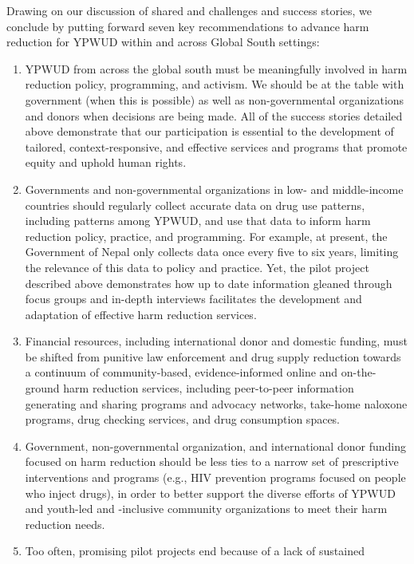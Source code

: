 \documentclass[
  letterpaper,
  DIV=11,
  numbers=noendperiod]{scrartcl}
\providecommand{\tightlist}{%
  \setlength{\itemsep}{0pt}\setlength{\parskip}{0pt}}\usepackage{longtable,booktabs,array}
\begin{document}
Drawing on our discussion of shared and challenges and success stories,
we conclude by putting forward seven key recommendations to advance harm
reduction for YPWUD within and across Global South settings:

\begin{enumerate}
\def\labelenumi{\arabic{enumi}.}
\tightlist
\item
  YPWUD from across the global south must be meaningfully involved in
  harm reduction policy, programming, and activism. We should be at the
  table with government (when this is possible) as well as
  non-governmental organizations and donors when decisions are being
  made. All of the success stories detailed above demonstrate that our
  participation is essential to the development of tailored,
  context-responsive, and effective services and programs that promote
  equity and uphold human rights.
\item
  Governments and non-governmental organizations in low- and
  middle-income countries should regularly collect accurate data on drug
  use patterns, including patterns among YPWUD, and use that data to
  inform harm reduction policy, practice, and programming. For example,
  at present, the Government of Nepal only collects data once every five
  to six years, limiting the relevance of this data to policy and
  practice. Yet, the pilot project described above demonstrates how up
  to date information gleaned through focus groups and in-depth
  interviews facilitates the development and adaptation of effective
  harm reduction services.
\item
  Financial resources, including international donor and domestic
  funding, must be shifted from punitive law enforcement and drug supply
  reduction towards a continuum of community-based, evidence-informed
  online and on-the-ground harm reduction services, including
  peer-to-peer information generating and sharing programs and advocacy
  networks, take-home naloxone programs, drug checking services, and
  drug consumption spaces.
\item
  Government, non-governmental organization, and international donor
  funding focused on harm reduction should be less ties to a narrow set
  of prescriptive interventions and programs (e.g., HIV prevention
  programs focused on people who inject drugs), in order to better
  support the diverse efforts of YPWUD and youth-led and -inclusive
  community organizations to meet their harm reduction needs.
\item
  Too often, promising pilot projects end because of a lack of sustained

\end{enumerate}
\end{document}
